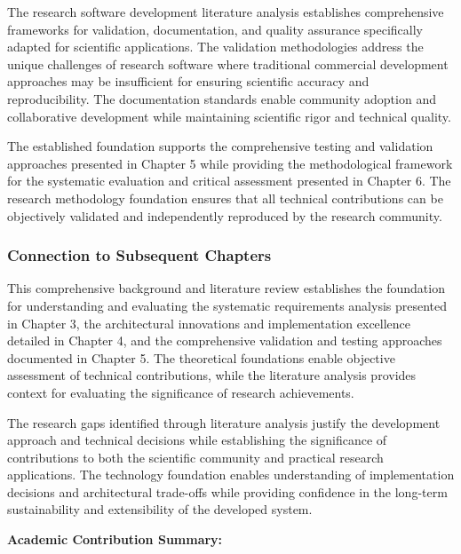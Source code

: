 \documentclass[12pt,a4paper]{report}
\begin{document}
The research software development literature analysis establishes comprehensive frameworks for validation,
documentation, and quality assurance specifically adapted for scientific applications. The validation methodologies
address the unique challenges of research software where traditional commercial development approaches may be
insufficient for ensuring scientific accuracy and reproducibility. The documentation standards enable community adoption
and collaborative development while maintaining scientific rigor and technical quality.

The established foundation supports the comprehensive testing and validation approaches presented in Chapter 5 while
providing the methodological framework for the systematic evaluation and critical assessment presented in Chapter 6. The
research methodology foundation ensures that all technical contributions can be objectively validated and independently
reproduced by the research community.

\subsubsection{Connection to Subsequent Chapters}

This comprehensive background and literature review establishes the foundation for understanding and evaluating the
systematic requirements analysis presented in Chapter 3, the architectural innovations and implementation excellence
detailed in Chapter 4, and the comprehensive validation and testing approaches documented in Chapter 5. The theoretical
foundations enable objective assessment of technical contributions, while the literature analysis provides context for
evaluating the significance of research achievements.

The research gaps identified through literature analysis justify the development approach and technical decisions while
establishing the significance of contributions to both the scientific community and practical research applications. The
technology foundation enables understanding of implementation decisions and architectural trade-offs while providing
confidence in the long-term sustainability and extensibility of the developed system.

\textbf{Academic Contribution Summary:}
\end{document}
